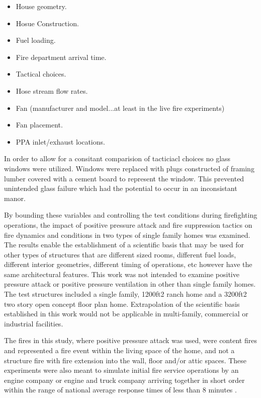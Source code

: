 \documentclass{article}
\begin{document}
\begin{itemize}
	\item House geometry.
	\item Hosue Construction.
	\item Fuel loading. 
	\item Fire department arrival time. 
	\item Tactical choices.
	\item Hose stream flow rates.
	\item Fan (manufacturer and model...at least in the live fire experiments)
	\item Fan placement.
	\item PPA inlet/exhaust locations. 
\end{itemize}

In order to allow for a consitant comparision of tacticiacl choices no glass windows were utilized. Windows were replaced with plugs constructed of framing lumber covered with a cement board to represent the window. This prevented unintended glass failure which had the potential to occur in an inconsistant manor.  

By bounding these variables and controlling the test conditions during firefighting operations, the impact of positive pressure attack and fire suppression tactics on fire dynamics and conditions in two types of single family homes was examined. The results enable the establishment of a scientific basis that may be used for other types of structures that are different sized rooms, different fuel loads, different interior geometries, different timing of operations, etc however have the same architectural features. This work was not intended to examine positive pressure attack or positive pressure ventilation in other than single family homes. The test structures included a single family, 1200ft2 ranch home and a 3200ft2 two story open concept floor plan home. Extrapolation of the scientific basis established in this work would not be applicable in multi-family, commercial or industrial facilities. 

The fires in this study, where positive pressure attack was used, were content fires and represented a fire event within the living space of the home, and not a structure fire with fire extension into the wall, floor and/or attic spaces. These experiments were also meant to simulate initial fire service operations by an engine company or engine and truck company arriving together in short order within the range of national average response times of less than 8 minutes \cite{USFA_Response_Times}.  
\end{document}
